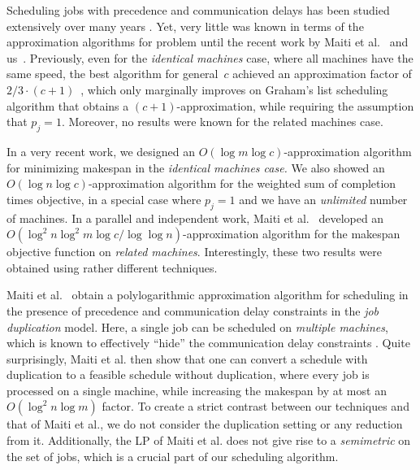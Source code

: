   
  \medskip
  Scheduling jobs with precedence and communication delays has been studied extensively over many years \cite{RAYWARDSMITH1987,PapadimitriouY90,MunierKonig,HanenMunier73Apx,ThurimellaYesha,HoogeveenLV94,PapadimitriouY90,GiroudeauKMP08}.
  Yet,  very little was known in terms of the approximation algorithms for problem until the recent work by Maiti et al.~\cite{MRSSV} and us~\cite{DKRTZ20}.
  Previously, even for the {\em identical machines} case, where all machines have the same speed, the best algorithm for general~$c$  achieved an approximation factor of $2/3 \cdot (c+1)$~\cite{GiroudeauKMP08}, which only marginally improves on Graham's list scheduling algorithm that obtains a $(c+1)$-approximation, while requiring the assumption that $p_j = 1$.
  Moreover, no results were known for the related machines case.
  
  \medskip
  In a very recent work, we  \cite{DKRTZ20} designed an $O(\log m \log c)$-approximation algorithm for minimizing makespan in the {\em identical machines case.}
  We also showed an $O(\log n \log c)$-approximation algorithm for the weighted sum of completion times objective, in a special case where $p_j = 1$ and we have an {\em unlimited} number of machines. 
  In a parallel and independent work, Maiti {et al.}~\cite{MRSSV} developed an $O(\log^2 n \log^2 m \log c / \log \log n)$-approximation algorithm for the makespan objective function on {\em related machines}.
  Interestingly, these two results were obtained using rather different techniques.
  
  
  
  Maiti {et al.}~\cite{MRSSV} obtain a polylogarithmic approximation algorithm for scheduling in the presence of precedence and communication delay constraints in the {\em job duplication} model. 
  Here, a single job can be scheduled on {\em multiple machines}, which is known to effectively ``hide'' the communication delay constraints \cite{PapadimitriouY90}.
  Quite surprisingly, Maiti {et al.} then show that one can convert a schedule with duplication to a feasible schedule without duplication, 
  where every job is processed on a single machine, while increasing the makespan by at most an $O(\log^2 n \log m)$ factor.
  To create a strict contrast between our techniques and that of Maiti {et al.}, 
  we do not consider the duplication setting or any reduction from it.
  Additionally, the LP of Maiti {et al.} does not give rise to a {\em semimetric} on the set of jobs, 
  which is a crucial part of our scheduling algorithm.
  

